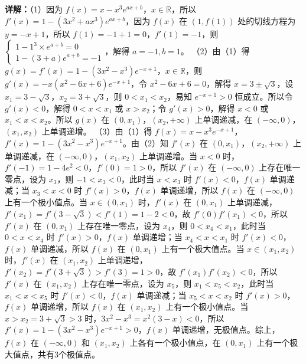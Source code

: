 \begin{question}[points=15]
\begin{solution}
\textbf{详解：}（1）因为 $f(x)=x-x^3e^{ax+b}$，$x\in\mathbb{R}$，所以 $f'(x)=1-(3x^2+ax^3)e^{ax+b}$，因为 $f(x)$ 在 $(1,f(1))$ 处的切线方程为 $y=-x+1$，所以 $f(1)=-1+1=0$，$f'(1)=-1$，则 $\begin{cases} 1-1^3\times e^{a+b}=0 \\ 1-(3+a)e^{a+b}=-1 \end{cases}$，解得 $a=-1,b=1$。
（2）由（1）得 $g(x)=f'(x)=1-(3x^2-x^3)e^{-x+1}$，$x\in\mathbb{R}$，则 $g'(x)=-x(x^2-6x+6)e^{-x+1}$，令 $x^2-6x+6=0$，解得 $x=3\pm\sqrt{3}$，设 $x_1=3-\sqrt{3}$，$x_2=3+\sqrt{3}$，则 $0<x_1<x_2$，易知 $e^{-x+1}>0$ 恒成立。所以令 $g'(x)<0$，解得 $0<x<x_1$ 或 $x>x_2$；令 $g'(x)>0$，解得 $x<0$ 或 $x_1<x<x_2$。所以 $g(x)$ 在 $(0,x_1)$，$(x_2,+\infty)$ 上单调递减，在 $(-\infty,0)$，$(x_1,x_2)$ 上单调递增。
（3）由（1）得 $f(x)=x-x^3e^{-x+1}$，$f'(x)=1-(3x^2-x^3)e^{-x+1}$。由（2）知 $f'(x)$ 在 $(0,x_1)$，$(x_2,+\infty)$ 上单调递减，在 $(-\infty,0)$，$(x_1,x_2)$ 上单调递增。当 $x<0$ 时，$f'(-1)=1-4e^2<0$，$f'(0)=1>0$，所以 $f'(x)$ 在 $(-\infty,0)$ 上存在唯一零点，设为 $x_3$，则 $-1<x_3<0$，此时当 $x<x_3$ 时 $f'(x)<0$，$f(x)$ 单调递减；当 $x_3<x<0$ 时 $f'(x)>0$，$f(x)$ 单调递增，所以 $f(x)$ 在 $(-\infty,0)$ 上有一个极小值点。当 $x\in(0,x_1)$ 时，$f'(x)$ 在 $(0,x_1)$ 上单调递减，$f'(x_1)=f'(3-\sqrt{3})<f'(1)=1-2<0$，故 $f'(0)f'(x_1)<0$，所以 $f'(x)$ 在 $(0,x_1)$ 上存在唯一零点，设为 $x_4$，则 $0<x_4<x_1$，此时当 $0<x<x_4$ 时 $f'(x)>0$，$f(x)$ 单调递增；当 $x_4<x<x_1$ 时 $f'(x)<0$，$f(x)$ 单调递减，所以 $f(x)$ 在 $(0,x_1)$ 上有一个极大值点。当 $x\in(x_1,x_2)$ 时，$f'(x)$ 在 $(x_1,x_2)$ 上单调递增，$f'(x_2)=f'(3+\sqrt{3})>f'(3)=1>0$，故 $f'(x_1)f'(x_2)<0$，所以 $f'(x)$ 在 $(x_1,x_2)$ 上存在唯一零点，设为 $x_5$，则 $x_1<x_5<x_2$，此时当 $x_1<x<x_5$ 时 $f'(x)<0$，$f(x)$ 单调递减；当 $x_5<x<x_2$ 时 $f'(x)>0$，$f(x)$ 单调递增，所以 $f(x)$ 在 $(x_1,x_2)$ 上有一个极小值点。当 $x>x_2=3+\sqrt{3}>3$ 时，$3x^2-x^3=x^2(3-x)<0$，所以 $f'(x)=1-(3x^2-x^3)e^{-x+1}>0$，$f(x)$ 单调递增，无极值点。综上，$f(x)$ 在 $(-\infty,0)$ 和 $(x_1,x_2)$ 上各有一个极小值点，在 $(0,x_1)$ 上有一个极大值点，共有3个极值点。
\end{solution}
\end{question}

